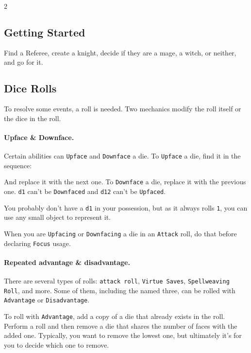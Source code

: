 \documentclass{osr-template/zine}
\begin{document}
\begin{multicols*}{2}

\subsection*{Getting Started}

Find a Referee, create a knight, decide if they are a mage, a witch, or neither, and go for it.

\subsection*{Dice Rolls}

To resolve some events, a roll is needed.
Two mechanics modify the roll itself or the dice in the roll.

\paragraph{Upface \& Downface.}

Certain abilities can \texttt{Upface} and \texttt{Downface} a die.
To \texttt{Upface} a die, find it in the sequence:

\colbox{
    \[\texttt{d1, d4, d6, d8, d12}\]
}

And replace it with the next one. To \texttt{Downface} a die, replace it with the previous one.
\texttt{d1} can't be \texttt{Downfaced} and \texttt{d12} can't be \texttt{Upfaced}.

You probably don't have a \texttt{d1} in your possession, but as it always rolls \texttt{1}, you can use any small object to represent it.

When you are \texttt{Upfacing} or \texttt{Downfacing} a die in an \texttt{Attack} roll, do that before declaring \texttt{Focus} usage.

\newcolumn
\paragraph{Repeated advantage \& disadvantage.}

There are several types of rolls: \texttt{attack roll}, \texttt{Virtue Saves}, \texttt{Spellweaving Roll}, and more.
Some of them, including the named three, can be rolled with \texttt{Advantage} or \texttt{Disadvantage}.

To roll with \texttt{Advantage}, add a copy of a die that already exists in the roll.
Perform a roll and then remove a die that shares the number of faces with the added one.
Typically, you want to remove the lowest one, but ultimately it's for you to decide which one to remove.


\end{multicols*}
\end{document}
